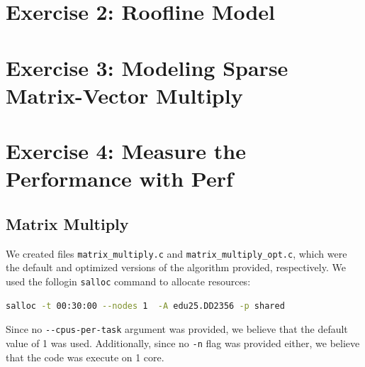 \documentclass[a4paper,10pt]{article}
\begin{document}

\section{Exercise 2: Roofline Model}

\section{Exercise 3: Modeling Sparse Matrix-Vector Multiply}

\section{Exercise 4: Measure the Performance with Perf}
\subsection{Matrix Multiply}
\label{sec:matrix_multiply}
We created files \verb|matrix_multiply.c| and \verb|matrix_multiply_opt.c|, which were the default and optimized versions of the algorithm provided, respectively. We used the follogin \verb|salloc| command to allocate resources: 

\begin{lstlisting}[language=bash,basicstyle=\ttfamily]
salloc -t 00:30:00 --nodes 1  -A edu25.DD2356 -p shared
\end{lstlisting}
Since no \verb|--cpus-per-task| argument was provided, we believe that the default value of 1 was used. Additionally, since no \verb|-n| flag was provided either, we believe that the code was execute on 1 core. 
\end{document}

